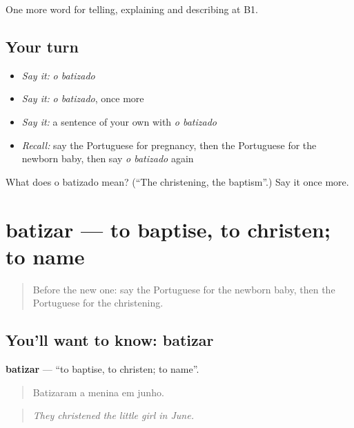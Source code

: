 \begin{grammarlens}[title={What you've built}]
One more word for telling, explaining and describing at B1.
\end{grammarlens}

\subsection*{Your turn}
\begin{itemize}
\raggedright
  \item \emph{Say it:} \emph{o batizado}
  \item \emph{Say it:} \emph{o batizado}, once more
  \item \emph{Say it:} a sentence of your own with \emph{o batizado}
  \item \emph{Recall:} say the Portuguese for pregnancy, then the Portuguese for the newborn baby, then say \emph{o batizado} again
\end{itemize}

\begin{tcolorbox}[breakable,colback=teal!4,colframe=teal!35!black,title={Before you move on}]
What does o batizado mean? (\textquotedblleft{}The christening, the baptism\textquotedblright{}.) Say it once more.
\end{tcolorbox}
\section[batizar]{batizar — to baptise, to christen; to name}

\label{lesson:PT-C310-batizar}



\begin{quote}
Before the new one: say the Portuguese for the newborn baby, then the Portuguese for the christening.
\end{quote}

\subsection*{You'll want to know: batizar}
\textbf{batizar} — \textquotedblleft{}to baptise, to christen; to name\textquotedblright{}.

\begin{quote}
Batizaram a menina em junho.
\end{quote}

\begin{quote}
\emph{They christened the little girl in June.}
\end{quote}

